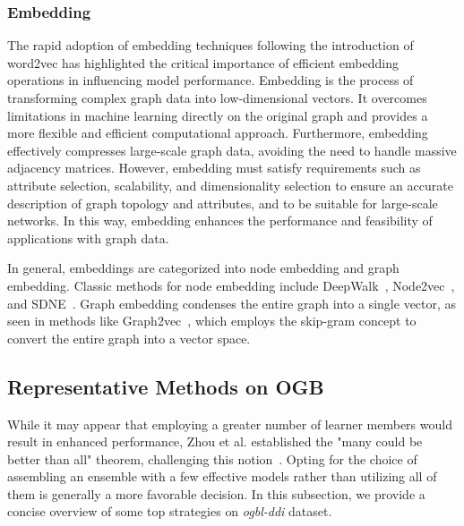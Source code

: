 \documentclass[11pt]{article}
\begin{document}
\subsubsection{Embedding}
The rapid adoption of embedding techniques following the introduction of word2vec has highlighted the critical importance of efficient embedding operations in influencing model performance. Embedding is the process of transforming complex graph data into low-dimensional vectors. It overcomes limitations in machine learning directly on the original graph and provides a more flexible and efficient computational approach. Furthermore, embedding effectively compresses large-scale graph data, avoiding the need to handle massive adjacency matrices. However, embedding must satisfy requirements such as attribute selection, scalability, and dimensionality selection to ensure an accurate description of graph topology and attributes, and to be suitable for large-scale networks. In this way, embedding enhances the performance and feasibility of applications with graph data. 

In general, embeddings are categorized into node embedding and graph embedding. Classic methods for node embedding include DeepWalk~\cite{perozzi2014deepwalk}, Node2vec~\cite{grover2016node2vec}, and SDNE~\cite{wang2016structural}. Graph embedding condenses the entire graph into a single vector, as seen in methods like Graph2vec~\cite{narayanan2017graph2vec}, which employs the skip-gram concept to convert the entire graph into a vector space. 

\subsection{Representative Methods on OGB}
While it may appear that employing a greater number of learner members would result in enhanced performance, Zhou et al. established the "many could be better than all" theorem, challenging this notion~\cite{zhou2002ensembling}. Opting for the choice of assembling an ensemble with a few effective models rather than utilizing all of them is generally a more favorable decision. In this subsection, we provide a concise overview of some top strategies on \textit{ogbl-ddi} dataset. 
\end{document}
